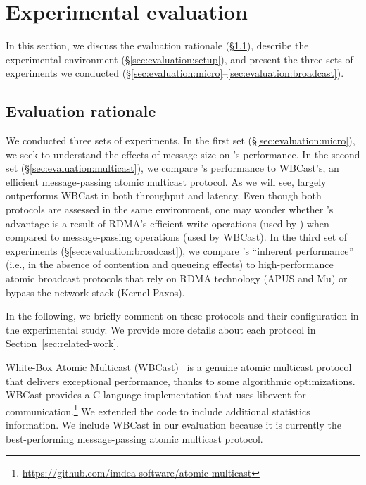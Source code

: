 \section{Experimental evaluation}
\label{sec:experimental-evaluation}

In this section, we discuss the evaluation rationale (\S\ref{sec:comp}), 
describe the experimental environment (\S\ref{sec:evaluation:setup}), and present
the three sets of experiments we conducted (\S\ref{sec:evaluation:micro}--\ref{sec:evaluation:broadcast}).


\subsection{Evaluation rationale}
\label{sec:comp}

We conducted three sets of experiments.
In the first set (\S\ref{sec:evaluation:micro}), we seek to understand the effects of message size on \libname's performance.
In the second set (\S\ref{sec:evaluation:multicast}), we compare \libname's performance to WBCast's, an efficient message-passing atomic multicast protocol.
As we will see, \libname largely outperforms WBCast in both throughput and latency.
Even though both protocols are assessed in the same environment, one may wonder whether \libname's advantage is a result of RDMA's efficient write operations (used by \libname) when compared to message-passing operations (used by WBCast).
In the third set of experiments (\S\ref{sec:evaluation:broadcast}), we compare \libname's ``inherent performance'' (i.e., in the absence of contention and queueing effects) to high-performance atomic broadcast protocols that rely on RDMA technology (APUS and Mu) or bypass the network stack (Kernel Paxos).

In the following, we briefly comment on these protocols and their configuration in the experimental study.
We provide more details about each protocol in Section~\ref{sec:related-work}.

White-Box Atomic Multicast (WBCast)~\cite{gotsman2019white} is a genuine atomic multicast protocol that delivers exceptional performance, thanks to some algorithmic optimizations.
 WBCast provides a C-language implementation that uses libevent for communication.\footnote{\url{https://github.com/imdea-software/atomic-multicast}}
 We extended the code to include additional statistics information.
We include WBCast in our evaluation because it is currently the best-performing message-passing atomic multicast protocol.

